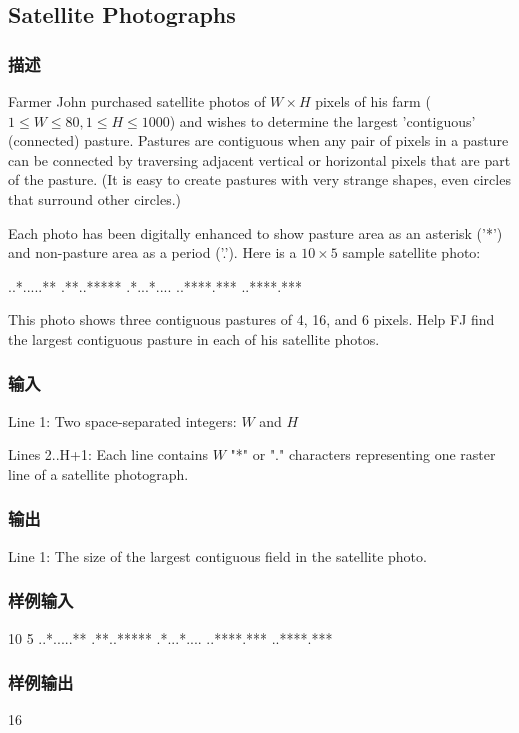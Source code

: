 \subsection{Satellite Photographs}

\subsubsection{描述}
Farmer John purchased satellite photos of $W \times H$ pixels of his farm ($1 \leq W \leq 80, 1 \leq H \leq 1000$) and wishes to determine the largest 'contiguous' (connected) pasture. Pastures are contiguous when any pair of pixels in a pasture can be connected by traversing adjacent vertical or horizontal pixels that are part of the pasture. (It is easy to create pastures with very strange shapes, even circles that surround other circles.) 

Each photo has been digitally enhanced to show pasture area as an asterisk ('*') and non-pasture area as a period ('.'). Here is a $10 \times 5$ sample satellite photo: 
\begin{Code}
..*.....** 
.**..***** 
.*...*.... 
..****.*** 
..****.*** 
\end{Code}

This photo shows three contiguous pastures of 4, 16, and 6 pixels. Help FJ find the largest contiguous pasture in each of his satellite photos.


\subsubsection{输入}
Line 1: Two space-separated integers: $W$ and $H$ 

Lines 2..H+1: Each line contains $W$ "*" or "." characters representing one raster line of a satellite photograph.


\subsubsection{输出}
Line 1: The size of the largest contiguous field in the satellite photo.


\subsubsection{样例输入}
\begin{Code}
10 5
..*.....**
.**..*****
.*...*....
..****.***
..****.***
\end{Code}


\subsubsection{样例输出}
\begin{Code}
16
\end{Code}


